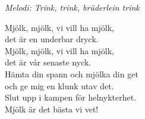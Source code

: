 {\footnotesize\textit{Melodi: Trink, trink, brüderlein trink}}\par
\vspace{10pt}
\revrtp Mjölk, mjölk, vi vill ha mjölk,\\
det är en underbar dryck.\\
Mjölk, mjölk, vi vill ha mjölk,\\
det är vår senaste nyck.\\
Hämta din spann och mjölka din get\\
och ge mig en klunk utav det.\\
Slut upp i kampen för helnykterhet.\\
Mjölk är det bästa vi vet!\rpt
